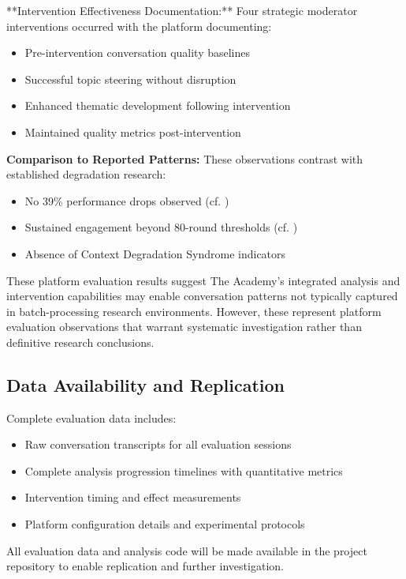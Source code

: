 \documentclass[11pt,letterpaper]{article}
\newcommand{\theacademy}{The Academy}
\begin{document}
**Intervention Effectiveness Documentation:**
Four strategic moderator interventions occurred with the platform documenting:
\begin{itemize}
    \item Pre-intervention conversation quality baselines
    \item Successful topic steering without disruption
    \item Enhanced thematic development following intervention
    \item Maintained quality metrics post-intervention
\end{itemize}

\textbf{Comparison to Reported Patterns:}
These observations contrast with established degradation research:
\begin{itemize}
    \item No 39\% performance drops observed (cf. \citep{laban2025lost})
    \item Sustained engagement beyond 80-round thresholds (cf. \citep{chen2023chatarena})
    \item Absence of Context Degradation Syndrome indicators
\end{itemize}

These platform evaluation results suggest \theacademy{}'s integrated analysis and intervention capabilities may enable conversation patterns not typically captured in batch-processing research environments. However, these represent platform evaluation observations that warrant systematic investigation rather than definitive research conclusions.

\subsection{Data Availability and Replication}

Complete evaluation data includes:
\begin{itemize}
    \item Raw conversation transcripts for all evaluation sessions
    \item Complete analysis progression timelines with quantitative metrics
    \item Intervention timing and effect measurements
    \item Platform configuration details and experimental protocols
\end{itemize}

All evaluation data and analysis code will be made available in the project repository to enable replication and further investigation.
\end{document}
